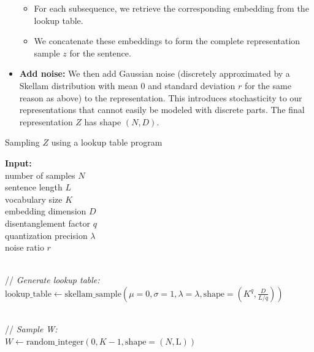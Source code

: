 \documentclass{article}
\begin{document}
\begin{appendices}
\begin{itemize}
\begin{itemize}
        \item For each subsequence, we retrieve the corresponding embedding from the lookup table.
        
        \item We concatenate these embeddings to form the complete representation sample $z$ for the sentence.
    \end{itemize}
    
    \item \textbf{Add noise:}
    We then add Gaussian noise (discretely approximated by a Skellam distribution with mean 0 and standard deviation $r$ for the same reason as above) to the representation. This introduces stochasticity to our representations that cannot easily be modeled with discrete parts. The final representation $Z$ has shape $(N, D)$.
\end{itemize}

\begin{algorithm}
\caption{Sampling $Z$ using a lookup table program}
\label{alg:context_free_grammar}
\begin{algorithmic}
\item \textbf{Input:}
\\ \hspace{1em} number of samples $N$
\\ \hspace{1em} sentence length $L$
\\ \hspace{1em} vocabulary size $K$
\\ \hspace{1em} embedding dimension $D$
\\ \hspace{1em} disentanglement factor $q$
\\ \hspace{1em} quantization precision $\lambda$
\\ \hspace{1em} noise ratio $r$

\item 
\\ // \textit{Generate lookup table:}
\\ $\text{lookup\_table} \leftarrow \text{skellam\_sample}(\mu=0, \sigma=1, \lambda=\lambda, \text{shape}=(K^q, \frac{D}{L / q}))$

\item 
\\ // \textit{Sample W:}
\\ $W \leftarrow \text{random\_integer}(0, K-1, \text{shape}=(N, \text{L}))$


\end{algorithmic}
\end{algorithm}
\end{appendices}
\end{document}

